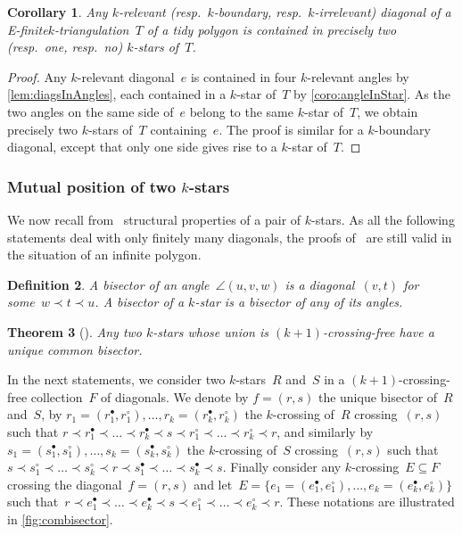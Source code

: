 \documentclass{amsart}
\newtheorem{theorem}{Theorem}[section]
\newtheorem{corollary}[theorem]{Corollary}
\newtheorem{definition}[theorem]{Definition}
\theoremstyle{remark}
\newcommand{\darkblue}{\color{darkblue}} %
\newcommand{\defn}[1]{\textsl{\darkblue #1}} %
\newcommand*{\ef}[0]{E-finite\xspace}
\newcommand{\cl}{\prec}
\begin{document}
\begin{corollary}
\label{coro:diagonalInStars}
Any $k$-relevant (resp.~$k$-boundary, resp.~$k$-irrelevant) diagonal of a \ef $k$-triangulation~$T$ of a tidy polygon is contained in precisely two (resp.~one, resp.~no) $k$-stars of~$T$.
\end{corollary}

\begin{proof}
Any $k$-relevant diagonal~$e$ is contained in four $k$-relevant angles by \cref{lem:diagsInAngles}, each contained in a $k$-star of~$T$ by \cref{coro:angleInStar}.
As the two angles on the same side of~$e$ belong to the same $k$-star of~$T$, we obtain precisely two $k$-stars of~$T$ containing~$e$.
The proof is similar for a $k$-boundary diagonal, except that only one side gives rise to a $k$-star of~$T$.
\end{proof}


\subsubsection{Mutual position of two $k$-stars}

We now recall from~\cite[Sect.~3]{PilaudSantos-multitriangulations} structural properties of a pair of $k$-stars.
As all the following statements deal with only finitely many diagonals, the proofs of~\cite{PilaudSantos-multitriangulations} are still valid in the situation of an infinite polygon.

\begin{definition}
A \defn{bisector} of an angle~$\angle(u,v,w)$ is a diagonal~$(v,t)$ for some~$w \cl t \cl u$.
A \defn{bisector} of a $k$-star is a bisector of any of its angles.
\end{definition}

\begin{theorem}[{\cite[Thm.~3.5]{PilaudSantos-multitriangulations}}]
\label{thm:uniqueCommonBisector}
Any two $k$-stars whose union is $(k+1)$-crossing-free have a unique common bisector.
\end{theorem}

In the next statements, we consider two $k$-stars~$R$ and~$S$ in a $(k+1)$-crossing-free collection~$F$ of diagonals.
We denote by $f = (r,s)$ the unique bisector of~$R$ and~$S$, by ${r_1 = (r^\bullet_1, r^\circ_1), \dots, r_k = (r^\bullet_k, r^\circ_k)}$ the $k$-crossing of~$R$ crossing~$(r,s)$ such that ${r \cl r^\bullet_1 \cl \dots \cl r^\bullet_k \cl s \cl r^\circ_1 \cl \dots \cl r^\circ_k \cl r}$, and similarly by~$s_1 = (s^\bullet_1, s^\circ_1), \dots, s_k = (s^\bullet_k, s^\circ_k)$ the $k$-crossing of~$S$ crossing~$(r,s)$ such that~$s \cl s^\circ_1 \cl \dots \cl s^\circ_k \cl r \cl s^\bullet_1 \cl \dots \cl s^\bullet_k \cl s$.
Finally consider any $k$-crossing~$E \subseteq F$ crossing the diagonal~$f = (r,s)$ and let~$E = \{e_1 = (e^\bullet_1, e^\circ_1), \dots, e_k = (e^\bullet_k, e^\circ_k)\}$ such that~${r \cl e^\bullet_1 \cl \dots \cl e^\bullet_k \cl s \cl e^\circ_1 \cl \dots \cl e^\circ_k \cl r}$.
These notations are illustrated in \cref{fig:combisector}.
\end{document}
